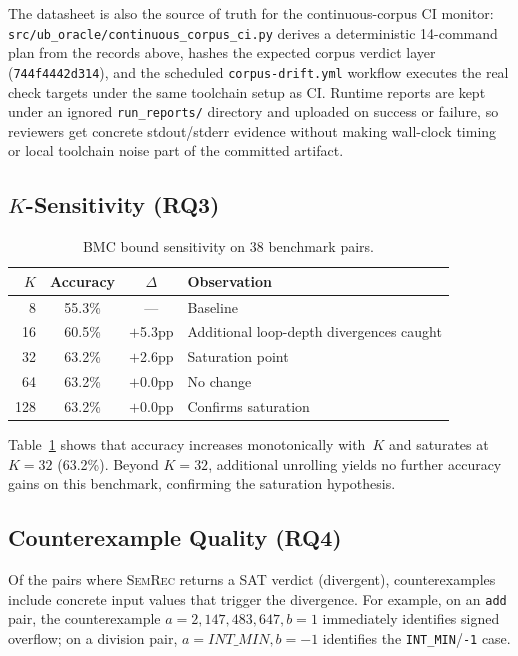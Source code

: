\documentclass[10pt,a4paper]{article}
\begin{document}
The datasheet is also the source of truth for the continuous-corpus CI monitor:
\texttt{src/ub\_oracle/continuous\_corpus\_ci.py} derives a deterministic
14-command plan from the records above, hashes the expected corpus verdict layer
(\texttt{744f4442d314}), and the scheduled
\texttt{corpus-drift.yml} workflow executes the real check targets under the same
toolchain setup as CI.  Runtime reports are kept under an ignored
\texttt{run\_reports/} directory and uploaded on success or failure, so reviewers
get concrete stdout/stderr evidence without making wall-clock timing or local
toolchain noise part of the committed artifact.

\subsection{$K$-Sensitivity (RQ3)}\label{sec:eval-k}

\begin{table}[t]
\centering
\small
\caption{BMC bound sensitivity on 38 benchmark pairs.}
\label{tab:k-sensitivity}
\begin{tabular}{@{}rccl@{}}
\toprule
$K$ & Accuracy & $\Delta$ & Observation \\
\midrule
8   & 55.3\% & ---       & Baseline \\
16  & 60.5\% & $+$5.3pp  & Additional loop-depth divergences caught \\
32  & 63.2\% & $+$2.6pp  & Saturation point \\
64  & 63.2\% & $+$0.0pp  & No change \\
128 & 63.2\% & $+$0.0pp  & Confirms saturation \\
\bottomrule
\end{tabular}
\end{table}

Table~\ref{tab:k-sensitivity} shows that accuracy increases
monotonically with~$K$ and saturates at $K{=}32$ (63.2\%).
Beyond $K{=}32$, additional unrolling yields no further accuracy
gains on this benchmark, confirming the saturation hypothesis.

\subsection{Counterexample Quality (RQ4)}\label{sec:eval-cex}

Of the pairs where \textsc{SemRec} returns a SAT verdict (divergent),
counterexamples include concrete input values that trigger the
divergence.  For example, on an \texttt{add} pair, the counterexample
$a = 2{,}147{,}483{,}647, b = 1$ immediately identifies signed
overflow; on a division pair, $a = \mathit{INT\_MIN}, b = -1$
identifies the \texttt{INT\_MIN}/\texttt{-1} case.
\end{document}
